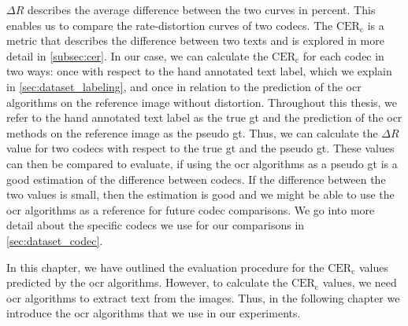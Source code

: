 $\Delta R$ describes the average difference between the two curves in percent.
This enables us to compare the rate-distortion curves of two codecs.
The $\text{CER}_{\text{c}}$ is a metric that describes the difference between two texts and is explored in more detail in \autoref{subsec:cer}.
In our case, we can calculate the $\text{CER}_{\text{c}}$ for each codec in two ways:
once with respect to the hand annotated text label, which we explain in \autoref{sec:dataset_labeling}, and once in relation to the prediction of the \gls{ocr} algorithms on the reference image without distortion.
Throughout this thesis, we refer to the hand annotated text label as the true \gls{gt} and the prediction of the \gls{ocr} methods on the reference image as the pseudo \gls{gt}.
Thus, we can calculate the $\Delta R$ value for two codecs with respect to the true \gls{gt} and the pseudo \gls{gt}.
These values can then be compared to evaluate, if using the \gls{ocr} algorithms as a pseudo \gls{gt} is a good estimation of the difference between codecs.
If the difference between the two values is small, then the estimation is good and we might be able to use the \gls{ocr} algorithms as a reference for future codec comparisons.
We go into more detail about the specific codecs we use for our comparisons in \autoref{sec:dataset_codec}.

In this chapter, we have outlined the evaluation procedure for the $\text{CER}_{\text{c}}$ values predicted by the \gls{ocr} algorithms.
However, to calculate the $\text{CER}_{\text{c}}$ values, we need \gls{ocr} algorithms to extract text from the images.
Thus, in the following chapter we introduce the \gls{ocr} algorithms that we use in our experiments.
